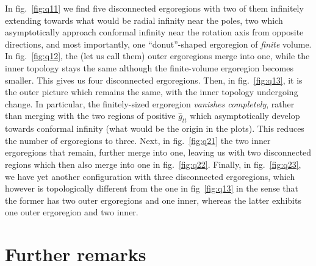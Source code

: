 \documentclass[aps,preprint,groupedaddress,nofootinbib,superscriptaddress,showkeys,showpacs,eqsecnum,amsmath,amssymb]{revtex4-1}
\begin{document}
In fig.~\ref{fig:q11} we find five disconnected ergoregions with two of them infinitely extending towards what would be radial infinity near the poles, two which asymptotically approach conformal infinity near the rotation axis from opposite directions, and most importantly, one ``donut''-shaped ergoregion of \emph{finite} volume. In fig.~\ref{fig:q12}, the (let us call them) outer ergoregions merge into one, while the inner topology stays the same although the finite-volume ergoregion becomes smaller. This gives us four disconnected ergoregions. Then, in fig.~\ref{fig:q13}, it is the outer picture which remains the same, with the inner topology undergoing change. In particular, the finitely-sized ergoregion \emph{vanishes completely}, rather than merging with the two regions of positive $\hat{g}_{tt}$ which asymptotically develop towards conformal infinity (what would be the origin in the plots). This reduces the number of ergoregions to three. Next, in fig.~\ref{fig:q21} the two inner ergoregions that remain, further merge into one, leaving us with two disconnected regions which then also merge into one in fig.~\ref{fig:q22}. Finally, in fig.~\ref{fig:q23}, we have yet another configuration with three disconnected ergoregions, which however is topologically different from the one in fig~\ref{fig:q13} in the sense that the former has two outer ergoregions and one inner, whereas the latter exhibits one outer ergoregion and two inner. 


\section{Further remarks} 

\end{document}
